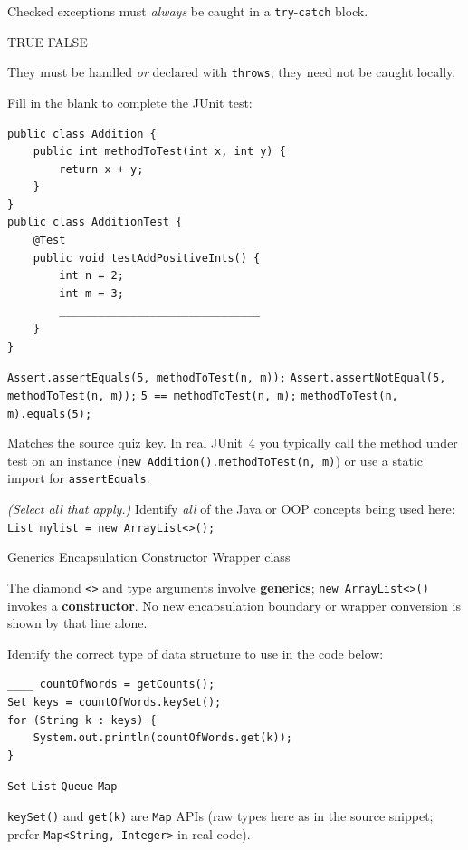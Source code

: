 \question[4]
Checked exceptions must \emph{always} be caught in a \texttt{try}-\texttt{catch} block.
\begin{choices}
  \choice TRUE
  \CorrectChoice FALSE
\end{choices}
\begin{solution}
  They must be handled \emph{or} declared with \texttt{throws}; they need not be caught locally.
\end{solution}

\question[4]
Fill in the blank to complete the JUnit test:
\begin{lstlisting}[style=java]
public class Addition {
    public int methodToTest(int x, int y) {
        return x + y;
    }
}
public class AdditionTest {
    @Test
    public void testAddPositiveInts() {
        int n = 2;
        int m = 3;
        _______________________________
    }
}
\end{lstlisting}
\begin{choices}
  \CorrectChoice \texttt{Assert.assertEquals(5, methodToTest(n, m));}
  \choice \texttt{Assert.assertNotEqual(5, methodToTest(n, m));}
  \choice \texttt{5 == methodToTest(n, m);}
  \choice \texttt{methodToTest(n, m).equals(5);}
\end{choices}
\begin{solution}
  Matches the source quiz key. In real JUnit~4 you typically call the method under test on an instance (\texttt{new Addition().methodToTest(n, m)}) or use a static import for \texttt{assertEquals}.
\end{solution}

\question[4]
\textit{(Select all that apply.)} Identify \emph{all} of the Java or OOP concepts being used here: \texttt{List mylist = new ArrayList<>();}
\begin{checkboxes}
  \CorrectChoice Generics
  \choice Encapsulation
  \CorrectChoice Constructor
  \choice Wrapper class
\end{checkboxes}
\begin{solution}
  The diamond \texttt{<>} and type arguments involve \textbf{generics}; \texttt{new ArrayList<>()} invokes a \textbf{constructor}. No new encapsulation boundary or wrapper conversion is shown by that line alone.
\end{solution}

\newpage

\question[4]
Identify the correct type of data structure to use in the code below:
\begin{lstlisting}[style=java]
____ countOfWords = getCounts();
Set keys = countOfWords.keySet();
for (String k : keys) {
    System.out.println(countOfWords.get(k));
}
\end{lstlisting}
\begin{choices}
  \choice \texttt{Set}
  \choice \texttt{List}
  \choice \texttt{Queue}
  \CorrectChoice \texttt{Map}
\end{choices}
\begin{solution}
  \texttt{keySet()} and \texttt{get(k)} are \texttt{Map} APIs (raw types here as in the source snippet; prefer \texttt{Map<String, Integer>} in real code).
\end{solution}

